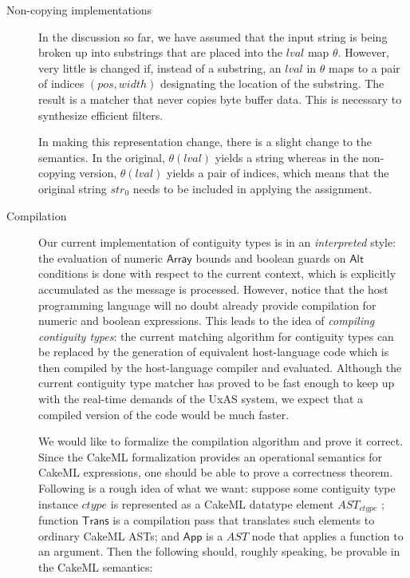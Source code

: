\documentclass[a4paper,UKenglish,cleveref, autoref, thm-restate]{lipics-v2021}
\newcommand{\konst}[1]{\ensuremath{\mathsf{#1}}}
\newcommand{\lval}{\ensuremath{\mathit{lval}}}
\begin{document}
\begin{description}
\item [Non-copying implementations] In the discussion so far, we have
  assumed that the input string is being broken up into substrings
  that are placed into the \lval{} map $\theta$. However, very little
  is changed if, instead of a substring, an \lval{} in $\theta$ maps
  to a pair of indices $(\mathit{pos},\mathit{width})$ designating the
  location of the substring. The result is a matcher that never copies
  byte buffer data. This is necessary to synthesize efficient filters.

  In making this representation change, there is a slight change to
  the semantics. In the original, $\theta(\lval)$ yields a string
  whereas in the non-copying version, $\theta(\lval)$ yields a pair of
  indices, which means that the original string $\mathit{str}_0$ needs
  to be included in applying the assignment.

\item [Compilation] Our current implementation of contiguity types is
  in an \emph{interpreted} style: the evaluation of numeric
  \konst{Array} bounds and boolean guards on \konst{Alt} conditions is
  done with respect to the current context, which is explicitly
  accumulated as the message is processed. However, notice that the
  host programming language will no doubt already provide compilation
  for numeric and boolean expressions. This leads to the idea of
  \emph{compiling contiguity types}: the current matching algorithm
  for contiguity types can be replaced by the generation of equivalent
  host-language code which is then compiled by the host-language
  compiler and evaluated. Although the current contiguity type matcher
  has proved to be fast enough to keep up with the real-time demands
  of the UxAS system, we expect that a compiled version of the code
  would be much faster.

 We would like to formalize the compilation algorithm and prove it
 correct. Since the CakeML formalization provides an operational
 semantics for CakeML expressions, one should be able to prove a
 correctness theorem. Following is a rough idea of what we want:
 suppose some contiguity type instance $\mathit{ctype}$ is
 represented as a CakeML datatype element
 $\mathit{AST}_{\mathit{ctype}}$ ; function $\konst{Trans}$ is a
 compilation pass that translates such elements to ordinary CakeML
 ASTs; and \konst{App} is a $\mathit{AST}$ node that applies a
 function to an argument. Then the following should, roughly speaking, be provable in the
 CakeML semantics:


\end{description}
\end{document}
